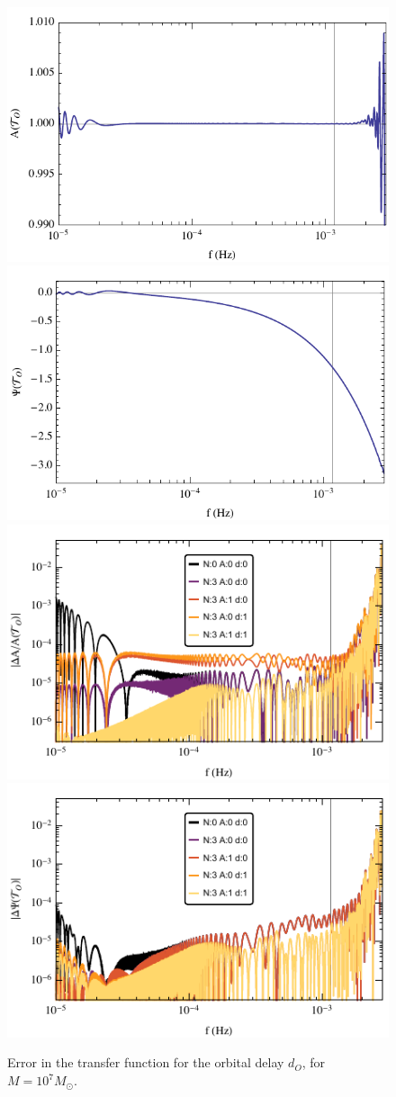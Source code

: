 \documentclass[aps,showpacs,twocolumn,
prd,superscriptaddress,nofootinbib]{revtex4-1}
\newcommand{\Msol}{M_{\odot}}
\begin{document}
\begin{figure}
  \centering
  \includegraphics[width=.48\linewidth]{plots/LISAtransferM1e7dOamp.pdf}
  \hspace{0.2cm}
  \includegraphics[width=.48\linewidth]{plots/LISAtransferM1e7dOphase.pdf}
  \includegraphics[width=.48\linewidth]{plots/LISAerrorM1e7dOamp.pdf}
  \hspace{0.2cm}
  \includegraphics[width=.48\linewidth]{plots/LISAerrorM1e7dOphase.pdf}
  \caption{Error in the transfer function for the orbital delay $d_{O}$, for $M=10^{7} \Msol$.}
  \label{fig:prectoymodel}
\end{figure}
\end{document}
